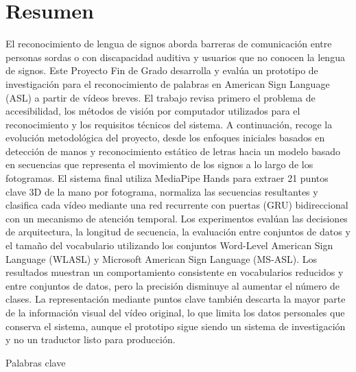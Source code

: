 \chapter*{Resumen}

El reconocimiento de lengua de signos aborda barreras de comunicaci{\'o}n entre personas sordas o
con discapacidad auditiva y usuarios que no conocen la lengua de signos. Este Proyecto Fin de Grado
desarrolla y eval{\'u}a un prototipo de investigaci{\'o}n para el reconocimiento de palabras en
American Sign Language (ASL) a partir de v{\'i}deos breves. El trabajo revisa primero el problema
de accesibilidad, los m{\'e}todos de visi{\'o}n por computador utilizados para el reconocimiento y
los requisitos t{\'e}cnicos del sistema. A continuaci{\'o}n, recoge la evoluci{\'o}n
metodol{\'o}gica del proyecto, desde los enfoques iniciales basados en detecci{\'o}n de manos y
reconocimiento est{\'a}tico de letras hacia un modelo basado en secuencias que representa el
movimiento de los signos a lo largo de los fotogramas. El sistema final utiliza MediaPipe Hands
para extraer 21 puntos clave 3D de la mano por fotograma, normaliza las secuencias resultantes y
clasifica cada v{\'i}deo mediante una red recurrente con puertas (GRU) bidireccional con un
mecanismo de atenci{\'o}n temporal. Los experimentos eval{\'u}an las decisiones de arquitectura, la
longitud de secuencia, la evaluaci{\'o}n entre conjuntos de datos y el tama{\~n}o del vocabulario
utilizando los conjuntos Word-Level American Sign Language (WLASL) y Microsoft American Sign
Language (MS-ASL). Los resultados muestran un comportamiento consistente en vocabularios reducidos
y entre conjuntos de datos, pero la precisi{\'o}n disminuye al aumentar el n{\'u}mero de clases. La
representaci{\'o}n mediante puntos clave tambi{\'e}n descarta la mayor parte de la informaci{\'o}n
visual del v{\'i}deo original, lo que limita los datos personales que conserva el sistema, aunque
el prototipo sigue siendo un sistema de investigaci{\'o}n y no un traductor listo para
producci{\'o}n.

\begin{keywords}{Palabras clave}
    \mykeywordses{}
\end{keywords}
